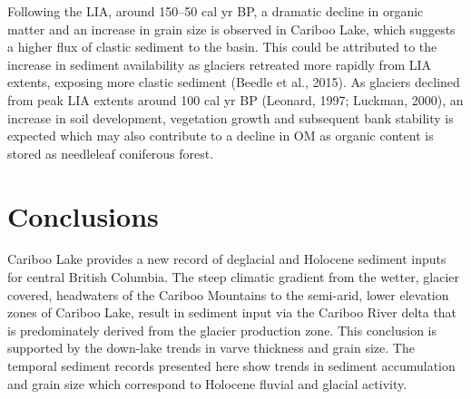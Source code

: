 \documentclass[
  letterpaper,
  DIV=11,
  numbers=noendperiod]{scrartcl}
\begin{document}
Following the LIA, around 150--50 cal yr BP, a dramatic decline in
organic matter and an increase in grain size is observed in Cariboo
Lake, which suggests a higher flux of clastic sediment to the basin.
This could be attributed to the increase in sediment availability as
glaciers retreated more rapidly from LIA extents, exposing more clastic
sediment (Beedle et al., 2015). As glaciers declined from peak LIA
extents around 100 cal yr BP (Leonard, 1997; Luckman, 2000), an increase
in soil development, vegetation growth and subsequent bank stability is
expected which may also contribute to a decline in OM as organic content
is stored as needleleaf coniferous forest.

\hypertarget{conclusions}{%
\section{Conclusions}\label{conclusions}}

Cariboo Lake provides a new record of deglacial and Holocene sediment
inputs for central British Columbia. The steep climatic gradient from
the wetter, glacier covered, headwaters of the Cariboo Mountains to the
semi-arid, lower elevation zones of Cariboo Lake, result in sediment
input via the Cariboo River delta that is predominately derived from the
glacier production zone. This conclusion is supported by the down-lake
trends in varve thickness and grain size. The temporal sediment records
presented here show trends in sediment accumulation and grain size which
correspond to Holocene fluvial and glacial activity.
\end{document}
